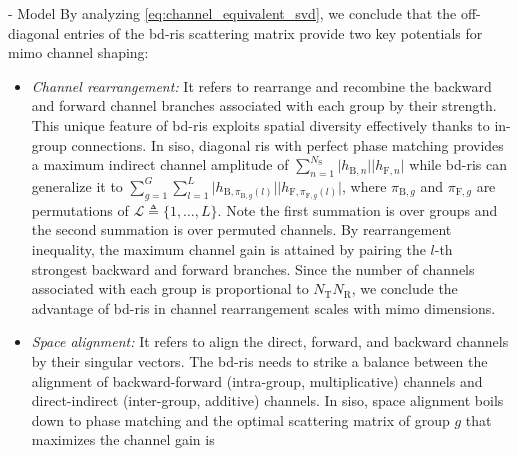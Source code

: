 \documentclass[journal]{IEEEtran}
\newtheorem{remark}{Remark}
\begin{document}
\begin{section}{- Model}
	By analyzing \eqref{eq:channel_equivalent_svd}, we conclude that the off-diagonal entries of the \gls{bd}-\gls{ris} scattering matrix provide two key potentials for \gls{mimo} channel shaping:
	\begin{itemize}
		\item \emph{Channel rearrangement:} It refers to rearrange and recombine the backward and forward channel branches associated with each group by their strength.
		This unique feature of \gls{bd}-\gls{ris} exploits spatial diversity effectively thanks to in-group connections.
		In \gls{siso}, diagonal \gls{ris} with perfect phase matching provides a maximum indirect channel amplitude of $\sum_{n=1}^{N_\mathrm{S}} \lvert h_{\mathrm{B},n} \rvert \lvert h_{\mathrm{F},n} \rvert$ while \gls{bd}-\gls{ris} can generalize it to $\sum_{g=1}^{G} \sum_{l=1}^{L} \lvert h_{\mathrm{B},\pi_{\mathrm{B},g}(l)} \rvert \lvert h_{\mathrm{F},\pi_{\mathrm{F},g}(l)} \rvert$, where $\pi_{\mathrm{B},g}$ and $\pi_{\mathrm{F},g}$ are permutations of $\mathcal{L} \triangleq \{1, \ldots, L\}$.
		Note the first summation is over groups and the second summation is over permuted channels.
		By rearrangement inequality, the maximum channel gain is attained by pairing the $l$-th strongest backward and forward branches.
		Since the number of channels associated with each group is proportional to $N_\mathrm{T} N_\mathrm{R}$, we conclude the advantage of \gls{bd}-\gls{ris} in channel rearrangement scales with \gls{mimo} dimensions.
		\item \emph{Space alignment:} It refers to align the direct, forward, and backward channels by their singular vectors.
		The \gls{bd}-\gls{ris} needs to strike a balance between the alignment of backward-forward (intra-group, multiplicative) channels and direct-indirect (inter-group, additive) channels. In \gls{siso}, space alignment boils down to phase matching and the optimal scattering matrix of group $g$ that maximizes the channel gain is

\end{itemize}
\end{section}
\end{document}
